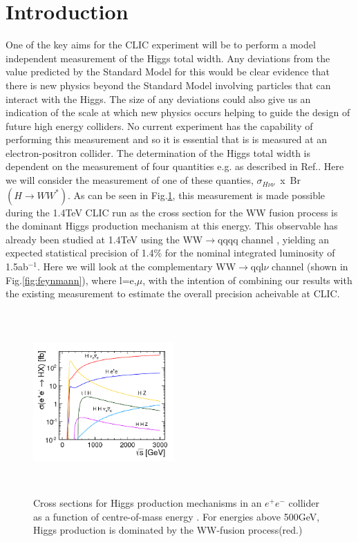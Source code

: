 \section{Introduction}
One of the key aims for the CLIC experiment will be to perform a model independent measurement of the Higgs total width. Any deviations from the value predicted by the Standard Model for this would be clear evidence that there is new physics beyond the Standard Model involving particles that can interact with the Higgs. The size of any deviations could also give us an indication of the scale at which new physics occurs helping to guide the design of future high energy colliders. No current experiment has the capability of performing this measurement and so it is essential that is is measured at an electron-positron collider. The determination of the Higgs total width is dependent on the measurement of four quantities e.g. as described in Ref.\cite{Durig:2014lfa}. Here we will consider the measurement of one of these quanties, $\sigma_{H\nu\nu}$~x~Br$(H\rightarrow WW^*)$. As can be seen in Fig.\ref{fig:HiggsCrossSections}, this measurement is made possible during the 1.4TeV CLIC run as the cross section for the WW fusion process is the dominant Higgs production mechanism at this energy. This observable has already been studied at 1.4TeV using the WW$\rightarrow$qqqq channel \cite{Pandurovic:2011508}, yielding an expected statistical precision of 1.4\% for the nominal integrated luminosity of 1.5ab$^{-1}$. Here we will look at the complementary WW$\rightarrow$qql$\nu$ channel (shown in Fig.\ref{fig:feynmann}), where l=e,$\mu$, with the intention of combining our results with the existing measurement to estimate the overall precision acheivable at CLIC. 


\begin{figure}
  \centering
  \includegraphics[width=0.48\textwidth,height=7cm,keepaspectratio]{figures/Midterm_HiggsCrossSections}
  \caption[Higgs Cross Sections]{Cross sections for Higgs production mechanisms in an ${e^+e^-}$ collider as a function of centre-of-mass energy \cite{Simon:2014aqa}. For energies above 500GeV, Higgs production is dominated by the WW-fusion process(red.)}
  \label{fig:HiggsCrossSections}
\end{figure}

